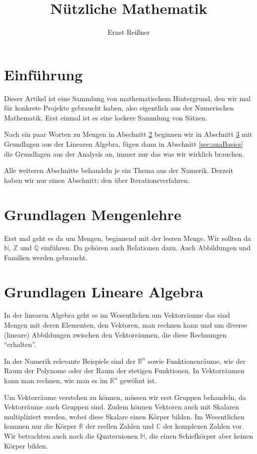 \documentclass[index=totoc]{scrartcl}%
\title{Nützliche Mathematik}
\author{Ernst Reißner}
\theoremstyle{definition}
\newcommand{\N}{\mathbb N}
\newcommand{\Z}{\mathbb Z}
\newcommand{\Q}{\mathbb Q}
\newcommand{\R}{\mathbb R}
\newcommand{\C}{\mathbb C}
\newcommand{\Hd}{\mathbb H}
\begin{document}
\maketitle
{}

\tableofcontents

\section{Einführung}

Dieser Artikel ist eine Sammlung von mathematischem Hintergrund,
den wir mal für konkrete Projekte gebraucht haben,
also eigentlich aus der Numerischen Mathematik.
Erst einmal ist es eine lockere Sammlung von Sätzen.

Nach ein paar Worten zu Mengen in Abschnitt \ref{sec:setsBasics}
beginnen wir in Abschnitt \ref{sec:laBasics}
mit Grundlagen aus der Linearen Algebra,
fügen dann in Abschnitt \ref{sec:anaBasics} die Grundlagen aus der Analysis an,
immer nur das was wir wirklich brauchen.

Alle weiteren Abschnitte behandeln je ein Thema aus der Numerik.
Derzeit haben wir nur einen Abschnitt:
den über Iterationsverfahren.

\newpage
\section{Grundlagen Mengenlehre}
\label{sec:setsBasics}

Erst mal geht es da um Mengen, beginnend mit der leeren Menge. 
Wir sollten da $\N$, $\Z$ und $\Q$ einführen.
Da gehören auch Relationen dazu.
Auch Abbildungen und Familien werden gebraucht. 

\section{Grundlagen Lineare Algebra}
\label{sec:laBasics}

In der linearen Algebra geht es im Wesentlichen um Vektorräume
das sind Mengen mit deren Elementen, den Vektoren, man rechnen kann 
und um diverse (lineare) Abbildungen zwischen den Vektorräumen,
die diese Rechnungen "`erhalten"'.

In der Numerik relevante Beispiele sind der $\R^n$
sowie Funktionenräume, wie der Raum der Polynome
oder der Raum der stetigen Funktionen.
In Vektorräumen kann man rechnen, wie man es im $\R^n$ gewöhnt ist. 

Um Vektorräume verstehen zu können, müssen wir erst Gruppen behandeln, 
da Vektorräume auch Gruppen sind.
Zudem können Vektoren auch mit Skalaren multipliziert werden,
wobei diese Skalare einen Körper bilden.
Im Wesentlichen kommen nur die Körper $\R$ der reellen Zahlen
und $\C$ der komplexen Zahlen vor.
Wir betrachten auch noch die Quaternionen $\Hd$,
die einen Schiefkörper aber keinen Körper bilden.
\end{document}
